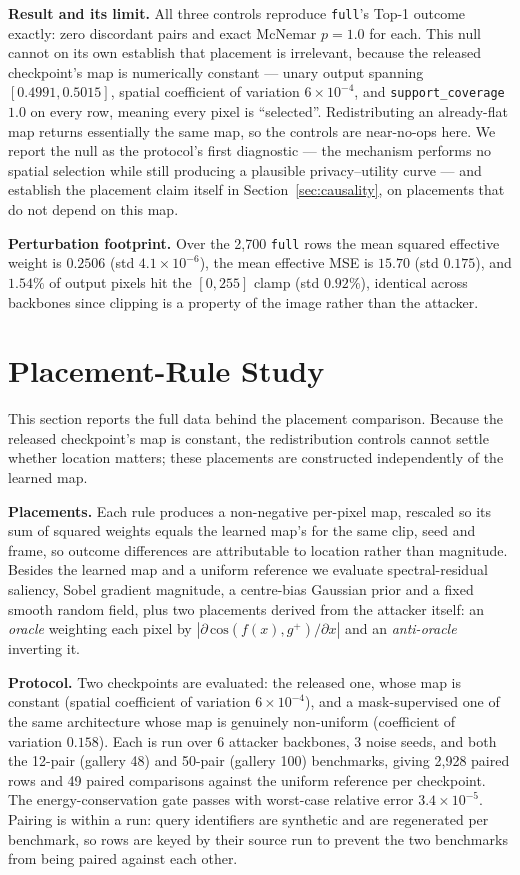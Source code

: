 \documentclass[10pt,journal]{IEEEtran}
\begin{document}
\textbf{Result and its limit.} All three controls reproduce \texttt{full}'s
Top-1 outcome exactly: zero discordant pairs and exact McNemar $p=1.0$ for
each. This null cannot on its own establish that placement is irrelevant,
because the released checkpoint's map is numerically constant --- unary output
spanning $[0.4991, 0.5015]$, spatial coefficient of variation
$6\times10^{-4}$, and \texttt{support\_coverage} $1.0$ on every row, meaning
every pixel is ``selected''. Redistributing an already-flat map returns
essentially the same map, so the controls are near-no-ops here. We report the
null as the protocol's first diagnostic --- the mechanism performs no spatial
selection while still producing a plausible privacy--utility curve --- and
establish the placement claim itself in Section~\ref{sec:causality}, on
placements that do not depend on this map.

\textbf{Perturbation footprint.} Over the 2,700 \texttt{full} rows the mean
squared effective weight is $0.2506$ (std $4.1\times10^{-6}$), the mean
effective MSE is $15.70$ (std $0.175$), and $1.54\%$ of output pixels hit the
$[0,255]$ clamp (std $0.92\%$), identical across backbones since clipping is a
property of the image rather than the attacker.

\section{Placement-Rule Study}
\label{sec:placement_appendix}

This section reports the full data behind the placement comparison. Because
the released checkpoint's map is constant, the redistribution controls cannot
settle whether location matters; these placements are constructed
independently of the learned map.

\textbf{Placements.} Each rule produces a non-negative per-pixel map, rescaled
so its sum of squared weights equals the learned map's for the same clip,
seed and frame, so outcome differences are attributable to location rather
than magnitude. Besides the learned map and a uniform reference we evaluate
spectral-residual saliency, Sobel gradient magnitude, a centre-bias Gaussian
prior and a fixed smooth random field, plus two placements derived from the
attacker itself: an \emph{oracle} weighting each pixel by
$|\partial\,\mathrm{cos}(f(x),g^{+})/\partial x|$ and an \emph{anti-oracle}
inverting it.

\textbf{Protocol.} Two checkpoints are evaluated: the released one, whose map
is constant (spatial coefficient of variation $6\times10^{-4}$), and a
mask-supervised one of the same architecture whose map is genuinely
non-uniform (coefficient of variation $0.158$). Each is run over 6 attacker
backbones, 3 noise seeds, and both the 12-pair (gallery 48) and 50-pair
(gallery 100) benchmarks, giving 2,928 paired rows and 49 paired comparisons
against the uniform reference per checkpoint. The energy-conservation gate
passes with worst-case relative error $3.4\times10^{-5}$. Pairing is within a
run: query identifiers are synthetic and are regenerated per benchmark, so
rows are keyed by their source run to prevent the two benchmarks from being
paired against each other.
\end{document}
